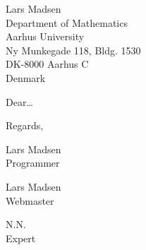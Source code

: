 \documentclass[%
 english,              %
 unit=math,            %
]{aultrdesign}
\begin{document}
\begin{ColophonData}
\end{ColophonData}
\begin{ReceiverAddress}
  Lars Madsen\\
  Department of Mathematics\\
  Aarhus University\\
  Ny Munkegade 118, Bldg. 1530\\
  DK-8000 Aarhus C\\
  Denmark
\end{ReceiverAddress}

\begin{Letter}
\opening{Dear\dots}

\kant[1] %


\begin{Closing}[grid]{Regards,}
  \begin{signer}[gfxvadjust=-5pt,
    gfxsignature={\texttt{[image: daleif]}}]
    Lars Madsen\\Programmer
  \end{signer}
  \begin{signer}
    Lars Madsen\\Webmaster
  \end{signer}
  \begin{signer}
    N.N.\\ Expert
  \end{signer}
\end{Closing}
\end{Letter}
\end{document}
